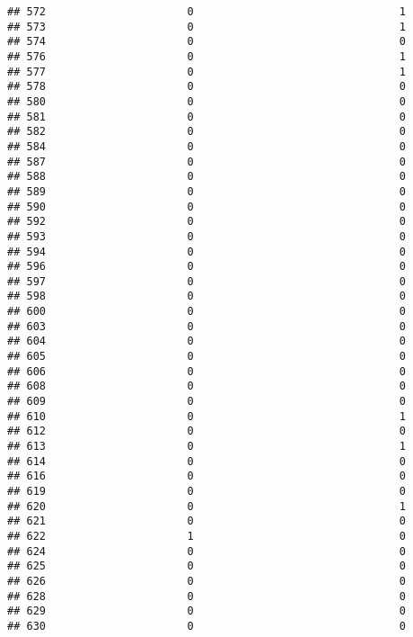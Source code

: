 \documentclass[
]{article}
\begin{document}
\begin{verbatim}
## 572                      0                                1
## 573                      0                                1
## 574                      0                                0
## 576                      0                                1
## 577                      0                                1
## 578                      0                                0
## 580                      0                                0
## 581                      0                                0
## 582                      0                                0
## 584                      0                                0
## 587                      0                                0
## 588                      0                                0
## 589                      0                                0
## 590                      0                                0
## 592                      0                                0
## 593                      0                                0
## 594                      0                                0
## 596                      0                                0
## 597                      0                                0
## 598                      0                                0
## 600                      0                                0
## 603                      0                                0
## 604                      0                                0
## 605                      0                                0
## 606                      0                                0
## 608                      0                                0
## 609                      0                                0
## 610                      0                                1
## 612                      0                                0
## 613                      0                                1
## 614                      0                                0
## 616                      0                                0
## 619                      0                                0
## 620                      0                                1
## 621                      0                                0
## 622                      1                                0
## 624                      0                                0
## 625                      0                                0
## 626                      0                                0
## 628                      0                                0
## 629                      0                                0
## 630                      0                                0

\end{verbatim}
\end{document}
